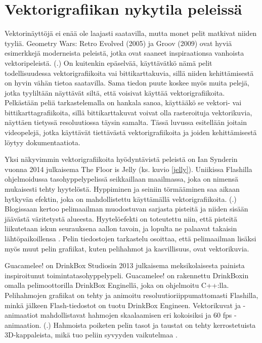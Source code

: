 \documentclass[utf8,bachelor]{gradu3}
\newcommand{\parencitedot}[1]{(\cite{#1}.)}
\begin{document}
\section{Vektorigrafiikan nykytila peleissä}\label{nykypelit}


Vektorinäyttöjä ei enää ole laajasti saatavilla, mutta monet pelit matkivat niiden tyyliä. Geometry Wars: Retro Evolved (2005) ja Groov (2009) ovat hyviä esimerkkejä moderneista peleistä, jotka ovat saaneet inspiraationsa vanhoista vektoripeleistä. \parencitedot{RefWorks:doc:5be15b13e4b05b9281959f24} On kuitenkin epäselvää, käyttävätkö nämä pelit todellisuudessa vektorigrafiikoita vai bittikarttakuvia, sillä niiden kehittämisestä on hyvin vähän tietoa saatavilla. Sama tiedon puute koskee myös muita pelejä, jotka tyyliltään näyttävät siltä, että voisivat käyttää vektorigrafiikoita. Pelkästään peliä tarkastelemalla on hankala sanoa, käyttääkö se vektori- vai bittikarttagrafiikoita, sillä bittikarttakuvat voivat olla rasteroituja vektorikuvia, näyttäen tietyssä resoluutiossa täysin samalta. Tässä luvussa esitellään joitain videopelejä, jotka käyttävät tiettävästä vektorigrafiikoita ja joiden kehittämisestä löytyy dokumentaatiota.

Yksi näkyvimmin vektorigrafiikoita hyödyntävistä peleistä on Ian Synderin vuonna 2014 julkaisema The Floor is Jelly (ks. kuvio \ref{jelly}). Uniikissa Flashilla ohjelmoidussa tasohyppelypelissä seikkaillaan maailmassa, joka on nimensä mukaisesti tehty hyytelöstä. Hyppiminen ja seiniin törmääminen saa aikaan hytkyvän efektin, joka on mahdollistettu käyttämällä vektorigrafiikoita. \parencitedot{RefWorks:doc:5beea20ce4b06f8a51cf9f11} Blogissaan \textcite{RefWorks:doc:5beec035e4b0463eaf2fd475} kertoo pelimaailman muodostuvan sarjasta pisteitä ja niiden sisään jäävästä väritetystä alueesta. Hyytelöefekti on toteutettu niin, että pisteitä liikutetaan iskun seurauksena aallon tavoin, ja lopulta ne palaavat takaisin lähtöpaikoillensa \parencite{RefWorks:doc:5beec035e4b0463eaf2fd475}. Pelin \parencite{RefWorks:doc:5beea20ce4b06f8a51cf9f11} tiedostojen tarkastelu osoittaa, että pelimaailman lisäksi myös muut pelin grafiikat, kuten pelihahmot ja kasvillisuus, ovat vektorikuvia.

Guacamelee! on DrinkBox Studiosin 2013 julkaisema meksikolaisesta painista inspiroitunut toimintatasohyppelypeli. Guacamelee! on rakennettu DrinkBoxin omalla pelimoottorilla DrinkBox Enginellä, joka on ohjelmoitu C++:lla. Pelihahmojen grafiikat on tehty ja animoitu resoluutioriippumattomasti Flashilla, minkä jälkeen Flash-tiedostot on tuotu DrinkBox Engineen. Vektorikuvat ja -animaatiot mahdollistavat hahmojen skaalaamisen eri kokoisiksi ja 60 fps -animaation. \parencitedot{RefWorks:doc:5bdc818be4b0965708b5a0f0} Hahmoista poiketen pelin tasot ja taustat on tehty kerrostetuista 3D-kappaleista, mikä tuo peliin syvyyden vaikutelmaa \parencite{RefWorks:doc:5beef606e4b03977dc5d4788}.
\end{document}
